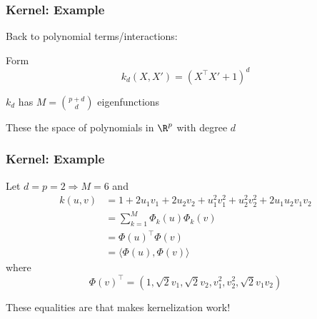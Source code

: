 \documentclass[12pt]{beamer}
\begin{document}
%
%
%
%


\begin{frame}
\frametitle{Kernel: Example}
Back to polynomial terms/interactions:

\vsp
Form
\[
k_d(X,X') = (X^{\top}X' + 1)^d 
\]

\vsp
$k_d$ has $M = {p + d \choose d}$ eigenfunctions

\vsp These  the space of polynomials in $\R^{p}$ with degree $d$
\end{frame}
\begin{frame}
\frametitle{Kernel: Example}

 Let $d = p = 2 \Rightarrow M = 6$ and
\begin{align*}
k(u,v) & = 1 + 2u_1v_1 + 2u_2v_2 + u_1^2v_1^2 + u_2^2v_2^2 + 2u_1u_2v_1v_2  \\
& = 
\sum_{k = 1}^M \Phi_k(u) \Phi_k(v) \\
& = 
 \Phi(u)^{\top} \Phi(v) \\
& =
\langle \Phi(u) , \Phi(v) \rangle
\end{align*}
where
\[
\Phi(v)^{\top}  = (1, \sqrt{2}v_1,\sqrt{2}v_2,v_1^2,v_2^2,\sqrt{2}v_1v_2)
\]
\vsp

 These equalities are  that makes kernelization work!
\end{frame}
\end{document}
